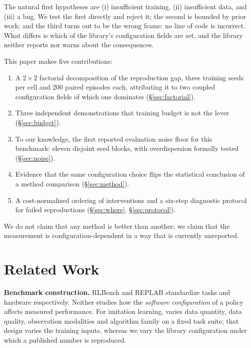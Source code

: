 \documentclass[11pt]{article}
\begin{document}
The natural first hypotheses are (i) insufficient training, (ii) insufficient data,
and (iii) a bug. We test the first directly and reject it; the second is bounded by
prior work; and the third turns out to be the wrong frame: no line of code is
incorrect. What differs is which of the library's configuration fields are set,
and the library neither reports nor warns about the consequences.

This paper makes five contributions:
\begin{enumerate}
  \item A $2\times2$ factorial decomposition of the reproduction gap, three
        training seeds per cell and 200 paired episodes each, attributing it to two
        coupled configuration fields of which one dominates (\S\ref{sec:factorial}).
  \item Three independent demonstrations that training budget is not the lever
        (\S\ref{sec:budget}).
  \item To our knowledge, the first reported evaluation noise floor for this benchmark: eleven
        disjoint seed blocks, with overdispersion formally tested
        (\S\ref{sec:noise}).
  \item Evidence that the same configuration choice flips the statistical
        conclusion of a method comparison (\S\ref{sec:method}).
  \item A cost-normalized ordering of interventions and a six-step diagnostic
        protocol for failed reproductions (\S\ref{sec:where}, \S\ref{sec:protocol}).
\end{enumerate}

We do not claim that any method is better than another; we claim that the
measurement is configuration-dependent in a way that is currently unreported.

\section{Related Work}

\textbf{Benchmark construction.} RLBench \cite{rlbench} and REPLAB
\cite{replab} standardize tasks and hardware respectively. Neither studies how
the \emph{software configuration} of a policy affects measured performance. For
imitation learning, \cite{robomimic} varies data quantity, data quality,
observation modalities and algorithm family on a fixed task suite; that design
varies the training inputs, whereas we vary the library configuration under
which a published number is reproduced.
\end{document}
